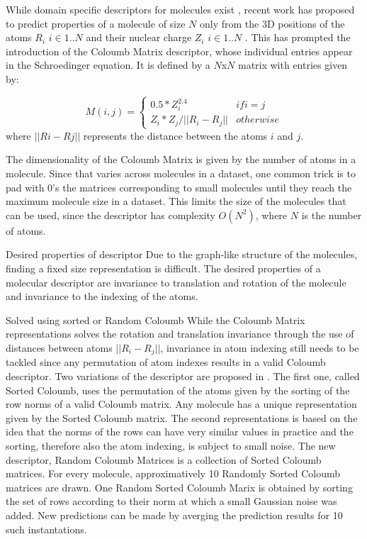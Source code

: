 \documentclass[10pt,journal,a4paper]{IEEEtran}
\begin{document}
While domain specific descriptors for molecules exist \cite{todeschini2000handbook}, recent work \cite{initialcoloumb} has proposed to predict properties of a molecule of size $N$ only from the 3D positions of the atoms $R_i$ $i\in{1..N}$ and their nuclear charge $Z_i$ $i\in{1..N}$ . This has prompted the introduction of the Coloumb Matrix descriptor, whose individual entries appear in the Schroedinger equation. It is defined by a $N$x$N$ matrix with entries given by:

\begin{equation}
M(i,j) = \left\{
  \begin{array}{lr}
    0.5*Z_i^{2.4} & if i = j\\
    Z_i * Z_j / ||R_i - R_j|| & otherwise
  \end{array}
\right.
\end{equation}
where $||Ri - Rj||$ represents the distance between the atoms $i$ and $j$.

The dimensionality of the Coloumb Matrix is given by the number of atoms in a molecule. Since that varies across molecules in a dataset, one common trick is to pad with 0's the matrices corresponding to small molecules until they reach the maximum molecule size in a dataset. This limits the size of the molecules that can be used, since the descriptor  has complexity $O(N^2)$, where $N$ is the number of atoms.

Desired properties of descriptor
Due to the graph-like structure of the molecules, finding a fixed size representation is difficult. The desired properties of a molecular descriptor are invariance to translation and rotation of the molecule and invariance to the indexing of the atoms.

Solved using sorted or Random Coloumb
While the Coloumb Matrix representations solves the rotation and translation invariance through the use of distances between atoms $||R_i -R_j||$, invariance in atom indexing still needs to be tackled since any permutation of atom indexes results in a valid Coloumb descriptor.
Two variations of the descriptor are proposed in \cite{montavon2012learning}. The first one, called Sorted Coloumb, uses the permutation of the atoms given by the sorting of the row norms of a valid Coloumb matrix. Any molecule has a unique representation given by the Sorted Coloumb matrix. The second representations is based on the idea that the norms of the rows can have very similar values in practice and the sorting, therefore also the atom indexing, is subject to small noise. The new descriptor, Random Coloumb Matrices is a collection of Sorted Coloumb matrices. For every molecule, approximatively 10 Randomly Sorted Coloumb matrices are drawn. One Random Sorted Coloumb Marix is obtained by sorting the set of  rows according to their norm at which a small Gaussian noise was added. New predictions can be made by averging the prediction results for 10 such instantations.
\end{document}
